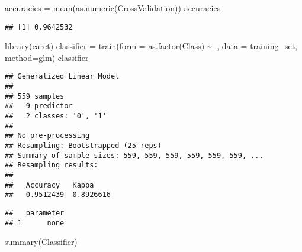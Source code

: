 \documentclass[
]{article}
\newenvironment{Shaded}{\begin{snugshade}}{\end{snugshade}}
\newcommand{\AttributeTok}[1]{\textcolor[rgb]{0.77,0.63,0.00}{#1}}
\newcommand{\FunctionTok}[1]{\textcolor[rgb]{0.00,0.00,0.00}{#1}}
\newcommand{\NormalTok}[1]{#1}
\newcommand{\OtherTok}[1]{\textcolor[rgb]{0.56,0.35,0.01}{#1}}
\newcommand{\SpecialCharTok}[1]{\textcolor[rgb]{0.00,0.00,0.00}{#1}}
\newcommand{\StringTok}[1]{\textcolor[rgb]{0.31,0.60,0.02}{#1}}
\begin{document}
\begin{Shaded}
\begin{Highlighting}[]
\NormalTok{accuracies }\OtherTok{=} \FunctionTok{mean}\NormalTok{(}\FunctionTok{as.numeric}\NormalTok{(CrossValidation))}
\NormalTok{accuracies}
\end{Highlighting}
\end{Shaded}

\begin{verbatim}
## [1] 0.9642532
\end{verbatim}

\begin{Shaded}
\begin{Highlighting}[]
\FunctionTok{library}\NormalTok{(caret)}
\NormalTok{classifier }\OtherTok{=} \FunctionTok{train}\NormalTok{(}\AttributeTok{form =} \FunctionTok{as.factor}\NormalTok{(Class) }\SpecialCharTok{\textasciitilde{}}\NormalTok{ ., }\AttributeTok{data =}\NormalTok{ training\_set, }\AttributeTok{method=}\StringTok{\textquotesingle{}glm\textquotesingle{}}\NormalTok{)}
\NormalTok{classifier}
\end{Highlighting}
\end{Shaded}

\begin{verbatim}
## Generalized Linear Model 
## 
## 559 samples
##   9 predictor
##   2 classes: '0', '1' 
## 
## No pre-processing
## Resampling: Bootstrapped (25 reps) 
## Summary of sample sizes: 559, 559, 559, 559, 559, 559, ... 
## Resampling results:
## 
##   Accuracy   Kappa    
##   0.9512439  0.8926616
\end{verbatim}

\begin{Shaded}
\end{Shaded}

\begin{verbatim}
##   parameter
## 1      none
\end{verbatim}

\begin{Shaded}
\begin{Highlighting}[]
\FunctionTok{summary}\NormalTok{(Classifier)}
\end{Highlighting}
\end{Shaded}
\end{document}
